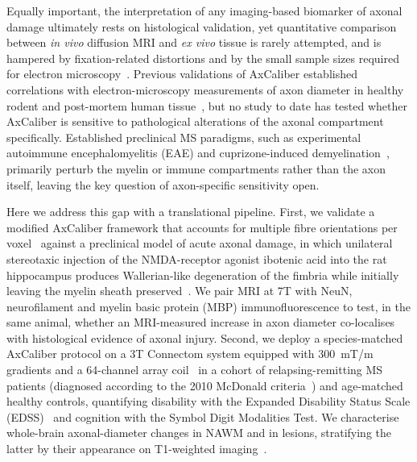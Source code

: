 \documentclass[11pt]{article}
\begin{document}
Equally important, the interpretation of any imaging-based biomarker of axonal damage ultimately rests on histological validation, yet quantitative comparison between \emph{in vivo} diffusion MRI and \emph{ex vivo} tissue is rarely attempted, and is hampered by fixation-related distortions and by the small sample sizes required for electron microscopy~\cite{horowitz2015axon}. Previous validations of AxCaliber established correlations with electron-microscopy measurements of axon diameter in healthy rodent and post-mortem human tissue~\cite{barazany2009invivo,horowitz2015axon}, but no study to date has tested whether AxCaliber is sensitive to pathological alterations of the axonal compartment specifically. Established preclinical MS paradigms, such as experimental autoimmune encephalomyelitis (EAE) and cuprizone-induced demyelination~\cite{constantinescu2011eae,torkildsen2008cuprizone}, primarily perturb the myelin or immune compartments rather than the axon itself, leaving the key question of axon-specific sensitivity open.

Here we address this gap with a translational pipeline. First, we validate a modified AxCaliber framework that accounts for multiple fibre orientations per voxel~\cite{desantis2019whole,tax2014recursive} against a preclinical model of acute axonal damage, in which unilateral stereotaxic injection of the NMDA-receptor agonist ibotenic acid into the rat hippocampus produces Wallerian-like degeneration of the fimbria while initially leaving the myelin sheath preserved~\cite{conforti2014wallerian,adalbert2012intra}. We pair MRI at 7T with NeuN, neurofilament and myelin basic protein (MBP) immunofluorescence to test, in the same animal, whether an MRI-measured increase in axon diameter co-localises with histological evidence of axonal injury. Second, we deploy a species-matched AxCaliber protocol on a 3T Connectom system equipped with \SI{300}{mT/m} gradients and a 64-channel array coil~\cite{jones2018microstructural} in a cohort of relapsing-remitting MS patients (diagnosed according to the 2010 McDonald criteria~\cite{polman2011diagnostic}) and age-matched healthy controls, quantifying disability with the Expanded Disability Status Scale (EDSS)~\cite{kurtzke1983rating} and cognition with the Symbol Digit Modalities Test. We characterise whole-brain axonal-diameter changes in NAWM and in lesions, stratifying the latter by their appearance on T1-weighted imaging~\cite{vanwaesberghe1999axonal}.
\end{document}
